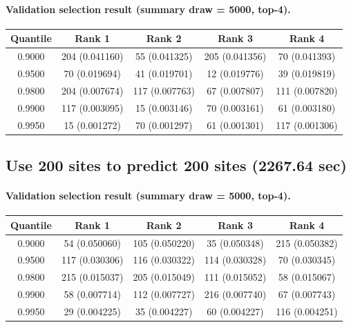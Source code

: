\documentclass[11pt]{article}
\begin{document}
\paragraph{Validation selection result (summary draw = 5000, top-4).}
\begin{center}
\scriptsize
\begin{tabular}{@{}ccccc@{}}
\toprule
Quantile & Rank 1 & Rank 2 & Rank 3 & Rank 4 \\
\midrule
0.9000 & 204 (0.041160) & 55 (0.041325) & 205 (0.041356) & 70 (0.041393) \\
0.9500 & 70 (0.019694) & 41 (0.019701) & 12 (0.019776) & 39 (0.019819) \\
0.9800 & 204 (0.007674) & 117 (0.007763) & 67 (0.007807) & 111 (0.007820) \\
0.9900 & 117 (0.003095) & 15 (0.003146) & 70 (0.003161) & 61 (0.003180) \\
0.9950 & 15 (0.001272) & 70 (0.001297) & 61 (0.001301) & 117 (0.001306) \\
\bottomrule
\end{tabular}
\end{center}

\subsection{Use 200 sites to predict 200 sites (2267.64 sec)}

\paragraph{Validation selection result (summary draw = 5000, top-4).}
\begin{center}
\scriptsize
\begin{tabular}{@{}ccccc@{}}
\toprule
Quantile & Rank 1 & Rank 2 & Rank 3 & Rank 4 \\
\midrule
0.9000 & 54 (0.050060) & 105 (0.050220) & 35 (0.050348) & 215 (0.050382) \\
0.9500 & 117 (0.030306) & 116 (0.030322) & 114 (0.030328) & 70 (0.030345) \\
0.9800 & 215 (0.015037) & 205 (0.015049) & 111 (0.015052) & 58 (0.015067) \\
0.9900 & 58 (0.007714) & 112 (0.007727) & 216 (0.007740) & 67 (0.007743) \\
0.9950 & 29 (0.004225) & 35 (0.004227) & 60 (0.004227) & 116 (0.004251) \\
\bottomrule
\end{tabular}
\end{center}
\end{document}
